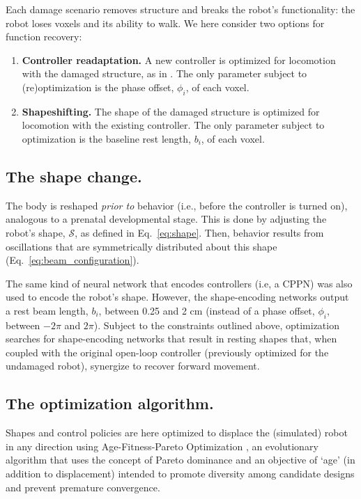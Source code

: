 Each damage scenario removes structure and breaks the robot's functionality: the robot loses voxels and its ability to walk.
We here consider two options for function recovery: 
\begin{enumerate}
    \setlength{\itemsep}{3pt}
    \item \textbf{Controller readaptation.}
    A new controller is optimized for locomotion with the damaged structure, as in \cite{bongard2006resilient,cully2015robots}.
    The only parameter subject to (re)optimization is the phase offset, $\phi_i$, of each voxel.
    \item \textbf{Shapeshifting.} The shape of the damaged structure is optimized for locomotion with the existing controller.
    The only parameter subject to optimization is the baseline rest length, $b_i$, of each voxel.
\end{enumerate}


\subsection{The shape change.}


The body is reshaped 
\textit{prior to} behavior (i.e., before the controller is turned on), analogous to a prenatal developmental stage.
This is done by adjusting the robot's shape, $\mathcal{S}$, as defined in Eq.~\ref{eq:shape}.
Then, behavior results from oscillations that are symmetrically distributed about this shape 
(Eq.~\ref{eq:beam_configuration}). 

The same kind of neural network that encodes controllers 
(i.e, a CPPN) 
was also used to encode 
the robot's shape.
However, the 
shape-encoding
networks output a rest beam length, $b_i$, between 0.25 and 2 cm (instead of a phase offset, $\phi_i$, between $-2\pi$ and $2\pi$).
Subject to the constraints outlined above,
optimization searches for shape-encoding networks that result in resting shapes that, when coupled with the original open-loop controller (previously optimized for the undamaged robot), synergize to recover forward movement.


\subsection{The optimization algorithm.}
\label{sec:optimization}


Shapes and control policies
are here optimized to displace the (simulated) robot in any direction using Age-Fitness-Pareto Optimization \citep{schmidt2011age}, 
an evolutionary algorithm that uses the concept of Pareto dominance and an objective of `age' (in addition to displacement) intended to promote diversity among candidate designs and prevent premature convergence.

